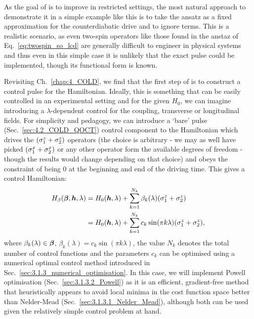 As the goal of  is to improve  in restricted settings, the most natural approach to demonstrate it in a simple example like this is to take the   ansatz as a fixed approximation for the counterdiabatic drive and to ignore  terms. This is a realistic scenario, as even two-spin operators like those found in the   anstaz of Eq.~\eqref{eq:twospin_so_lcd} are generally difficult to engineer in physical systems and thus even in this simple case it is unlikely that the exact  pulse could be implemented, though its functional form is known.

Revisiting Ch.~\ref{chap:4_COLD}, we find that the first step of  is to construct a control pulse for the Hamiltonian. Ideally, this is something that can be easily controlled in an experimental setting and for the given $H_0$, we can imagine introducing a $\lambda$-dependent control for the coupling, transverse or longitudinal fields. For simplicity and pedagogy, we can introduce a `bare' pulse (Sec.~\ref{sec:4.2_COLD_QOCT}) control component to the Hamiltonian which drives the $(\sigma^z_1 + \sigma^z_2)$ operators (the choice is arbitrary - we may as well have picked  $(\sigma^x_1 + \sigma^x_2)$ or any other operator form the available degrees of freedom - though the results would change depending on that choice) and obeys the constraint of being $0$ at the beginning and end of the driving time. This gives a control Hamiltonian:
\begin{equation}\label{eq:COLD_twospin_controlH}
    \begin{aligned}
        H_\beta(\boldsymbol{\beta}, \boldsymbol{h}, \lambda) &= H_0(\boldsymbol{h}, \lambda) + \sum_{k=1}^{N_k} \beta_k(\lambda) (\sigma^z_{1} + \sigma^z_{2}) \\
        &= H_0(\boldsymbol{h}, \lambda) + \sum_{k=1}^{N_k} c_k \sin (\pi k \lambda) (\sigma^z_{1} + \sigma^z_{2}),
    \end{aligned}
\end{equation}
where $\beta_k(\lambda) \in \boldsymbol{\beta}$, $\beta_k(\lambda) = c_k \sin (\pi k \lambda)$, the value $N_k$ denotes the total number of control functions and the parameters $c_k$ can be optimised using a numerical optimal control method introduced in Sec.~\ref{sec:3.1.3_numerical_optimisation}. In this case, we will implement Powell optimisation (Sec.~\ref{sec:3.1.3.2_Powell}) as it is an efficient, gradient-free method that heuristically appears to avoid local minima in the cost function space better than Nelder-Mead (Sec.~\ref{sec:3.1.3.1_Nelder_Mead}), although both can be used given the relatively simple control problem at hand. 

